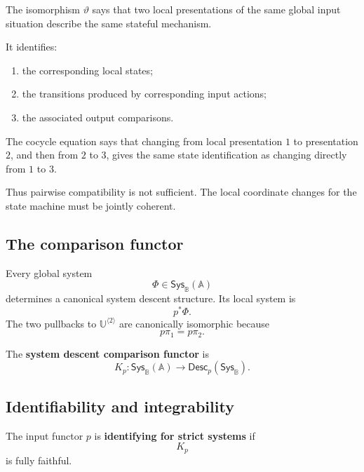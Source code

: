 \begin{remark}
\label{rem:operational-overlap-coherence}
The isomorphism \(\vartheta\) says that two local presentations of the same
global input situation describe the same stateful mechanism.

It identifies:
\begin{enumerate}
    \item the corresponding local states;
    \item the transitions produced by corresponding input actions;
    \item the associated output comparisons.
\end{enumerate}

The cocycle equation says that changing from local presentation \(1\) to
presentation \(2\), and then from \(2\) to \(3\), gives the same state
identification as changing directly from \(1\) to \(3\).

Thus pairwise compatibility is not sufficient. The local coordinate changes
for the state machine must be jointly coherent.
\end{remark}

\subsection{The comparison functor}
\label{subsec:system-descent-comparison}

Every global system
\[
    \Phi\in\mathsf{Sys}_{\mathbb B}(\mathbb A)
\]
determines a canonical system descent structure. Its local system is
\[
    p^\ast\Phi.
\]
The two pullbacks to
\(\mathbb U^{\langle2\rangle}\) are canonically isomorphic because
\[
    p\pi_1=p\pi_2.
\]

\begin{definition}
\label{def:system-descent-comparison-rigorous}
The \textbf{system descent comparison functor} is
\[
    K_p:
    \mathsf{Sys}_{\mathbb B}(\mathbb A)
    \to
    \mathsf{Desc}_p
    \left(
        \mathsf{Sys}_{\mathbb B}
    \right).
\]
\end{definition}

\subsection{Identifiability and integrability}
\label{subsec:identifiability-integrability-categorical}

\begin{definition}
\label{def:interface-identifiability-rigorous}
The input functor \(p\) is \textbf{identifying for strict systems} if
\[
    K_p
\]
is fully faithful.
\end{definition}

